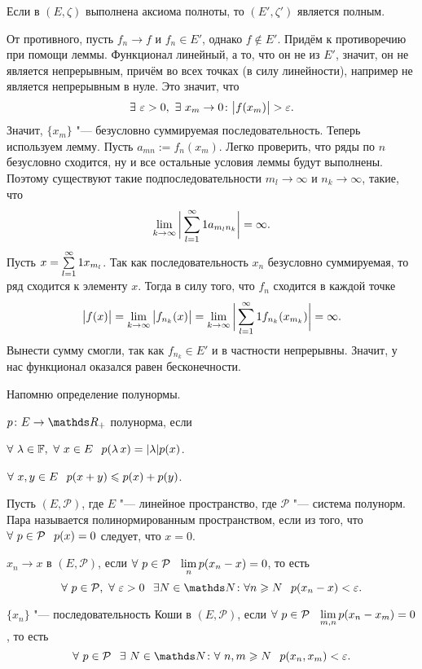 \begin{The}
  Если в $(E,\zeta)$ выполнена аксиома полноты, то $(E',\zeta')$ является полным.
\end{The}
\begin{Proof}
  От противного, пусть $f_n\to f$ и $f_n\in E'$, однако $f\not\in E'$. Придём к противоречию при помощи леммы. Функционал линейный, а то, что он не из $E'$, значит, он не является непрерывным, причём во всех точках (в силу линейности), например не является непрерывным в нуле. Это значит, что
\[
  \exists\ \e>0,\ \exists\ x_m\to 0\colon \big|f(x_m)\big|>\e.
\]
Значит, $\{x_m\}$ "--- безусловно суммируемая последовательность. Теперь используем лемму. Пусть $a_{mn}:=f_n(x_m)$. Легко проверить, что ряды по $n$ безусловно сходится, ну и все остальные условия леммы будут выполнены. Поэтому существуют такие подпоследовательности $m_l\to\infty$ и $n_k\to\infty$, такие, что 
\[
  \lim\limits_{k\rightarrow\infty}\bigg|\sum\limits_{{l}={1}}^\infty1 a_{m_ln_k}\bigg|=\infty.
\]
Пусть $x = \sum\limits_{{l}={1}}^\infty1 x_{m_l}$. Так как последовательность $x_n$ безусловно суммируемая, то ряд сходится к элементу $x$. Тогда в силу того, что $f_n$ сходится в каждой точке
\[
  \big|f(x)\big| = \lim\limits_{k\rightarrow\infty}\big|f_{n_k}(x)\big| = 
  \lim\limits_{k\rightarrow\infty}\bigg|\sum\limits_{{l}={1}}^\infty1 f_{n_k}(x_{m_k})\bigg| = \infty.
\]
Вынести сумму смогли, так как $f_{n_k}\in E'$ и в частности непрерывны. Значит, у нас функционал оказался равен бесконечности.
\end{Proof}

Напомню определение полунормы.
\begin{Def}
  $p\colon E\to\R_+$ полунорма, если
\begin{roItems}
  \item $\forall\ \l\in\F,\ \forall\ x\in E\pau  p(\lambda\,x) = |\l|p(x)$.
  \item $\forall\ x,y\in E\pau p(x+y)\le p(x)+p(y)$.
\end{roItems}
\end{Def}

\begin{Def}
Пусть $(E,\mathcal P)$, где $E$ "--- линейное пространство, где $\mathcal P$ "--- система полунорм. Пара называется полинормированным пространством, если из того, что $\forall\ p\in\mathcal P\pau p(x)=0$ следует, что $x=0$.
\end{Def}
\begin{Def}
 $x_n\to x$ в $(E,\mathcal P)$, если $\forall\ p\in\mathcal P\pau \lim\limits_n p(x_n-x)=0$, то есть
\[
  \forall\ p\in\mathcal P,\ \forall\ \e>0\pau \exists N\in\N\colon \forall n\ge N\pau p(x_n-x)<\e.
\]
\end{Def}
\begin{Def}
$\{x_n\}$ "--- последовательность Коши в $(E,\mathcal P)$, если $\forall\ p\in\mathcal P\pau \lim\limits_{m,n}p(x_n-x_m)=0$, то есть
\[
  \forall\ p\in\mathcal P\pau \exists\ N\in\N\colon\forall\ n,m\ge N\pau p(x_n,x_m)<\e.
\]
\end{Def}

